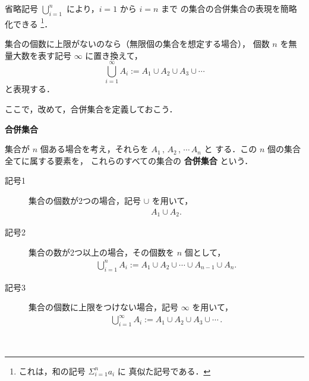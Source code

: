                     省略記号 $\bigcup_{i=1}^{n}$ により，$i=1$ から $i=n$ まで
                    の集合の合併集合の表現を簡略化できる
                        \footnote{
                                これは，和の記号 $\displaystyle\Sigma_{i=1}^{n}a_{i}$ に
                                真似た記号である．
                        }．

                    集合の個数に上限がないのなら（無限個の集合を想定する場合），
                    個数 $n$ を無量大数を表す記号 $\infty$ に置き換えて，
                        \begin{equation*}
                            \bigcup_{i=1}^{\infty} A_{i}
                                :=  A_{1} \cup A_{2} \cup  A_{3} \cup \cdots
                        \end{equation*}
                    と表現する．

                    ここで，改めて，合併集合を定義しておこう．
                    \\
                    \begin{itembox}[l]{\textbf{合併集合}}
                        \begin{dfn}
                            集合が $n$ 個ある場合を考え，それらを $A_{1}\,,\,A_{2}\,,\,\cdots\,A_{n}$ と
                            する．この $n$ 個の集合全てに属する要素を，
                            これらのすべての集合の \textbf{合併集合} という．
                            \begin{description}
                                \item[記号1] 集合の個数が2つの場合，記号 $\cup$ を用いて，
                                        \begin{align}
                                                A_{1} \cup A_{2}.
                                        \end{align}
                                \item[記号2] 集合の数が2つ以上の場合，その個数を $n$ 個として，
                                        \begin{align}
                                            \bigcup_{i=1}^{n} A_{i}
                                                :=  A_{1} \cup A_{2} \cup \cdots \cup A_{n-1} \cup A_{n}.
                                        \end{align}
                                \item[記号3] 集合の個数に上限をつけない場合，記号 $\infty$ を用いて，
                                        \begin{align}
                                            \bigcup_{i=1}^{\infty} A_{i}
                                                :=  A_{1} \cup A_{2} \cup  A_{3} \cup \cdots\,.
                                        \end{align}
                            \end{description}
                        \end{dfn}
                    \end{itembox}
                    \\

